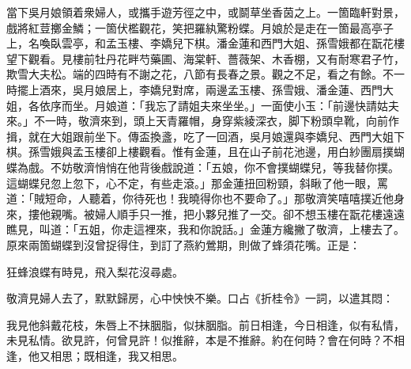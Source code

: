 當下吳月娘領着衆婦人，或攜手遊芳徑之中，或鬬草坐香茵之上。一箇臨軒對景，戲將紅荳擲金鱗；一箇伏檻觀花，笑把羅紈驚粉蝶。{}月娘於是走在一箇最高亭子上，名喚臥雲亭，和孟玉樓、李嬌兒下棋。潘金蓮和西門大姐、孫雪娥都在翫花樓望下觀看。見樓前牡丹花畔芍藥圃、海棠軒、薔薇架、木香棚，又有耐寒君子竹，欺雪大夫松。端的四時有不謝之花，八節有長春之景。觀之不足，看之有餘。不一時擺上酒來，吳月娘居上，李嬌兒對席，兩邊孟玉樓、孫雪娥、潘金蓮、西門大姐，各依序而坐。月娘道：「我忘了請姐夫來坐坐。」{}一面使小玉：「前邊快請姑夫來。」不一時，敬濟來到，頭上天青羅帽，身穿紫綾深衣，脚下粉頭皁靴，向前作揖，就在大姐跟前坐下。傳盃換盞，吃了一回酒，吳月娘還與李嬌兒、西門大姐下棋。孫雪娥與孟玉樓卻上樓觀看。惟有金蓮，且在山子前花池邊，用白紗團扇撲蝴蝶為戲。不妨敬濟悄悄在他背後戲說道：「五娘，你不會撲蝴蝶兒，等我替你撲。這蝴蝶兒忽上忽下，心不定，有些走滾。」{}那金蓮扭回粉頸，斜瞅了他一眼，罵道：「賊短命，人聽着，你待死也！我曉得你也不要命了。」{}那敬濟笑嘻嘻撲近他身來，摟他親嘴。被婦人順手只一推，把小夥兒推了一交。卻不想玉樓在翫花樓遠遠瞧見，叫道：「五姐，你走這裡來，我和你說話。」金蓮方纔撇了敬濟，上樓去了。原來兩箇蝴蝶到沒曾捉得住，到訂了燕約鶯期，則做了蜂須花嘴。正是：

\begin{myquote}
狂蜂浪蝶有時見，飛入梨花沒尋處。
\end{myquote}

敬濟見婦人去了，默默歸房，心中怏怏不樂。口占《折桂令》一詞，以遣其悶：

\begin{myquote}
我見他斜戴花枝，朱唇上不抹胭脂，似抹胭脂。前日相逢，今日相逢，似有私情，未見私情。欲見許，何曾見許！似推辭，本是不推辭。約在何時？會在何時？不相逢，他又相思；既相逢，我又相思。
\end{myquote}

